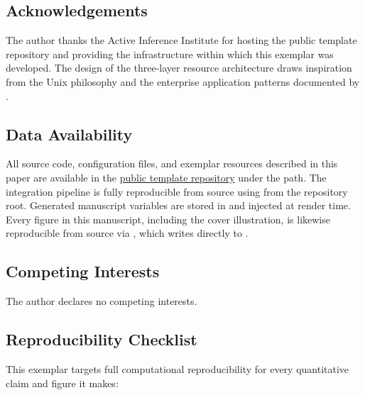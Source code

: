 \documentclass[
]{article}
\begin{document}
\subsection{Acknowledgements}\label{acknowledgements}

The author thanks the Active Inference Institute for hosting the public
template repository and providing the infrastructure within which this
exemplar was developed. The design of the three-layer resource
architecture draws inspiration from the Unix philosophy
\citep{Raymond2003art} and the enterprise application patterns
documented by \citep{Fowler2002patterns}.

\subsection{Data Availability}\label{data-availability}

All source code, configuration files, and exemplar resources described
in this paper are available in the
\href{https://github.com/docxology/template}{public template repository}
under the 
path. The integration pipeline is fully reproducible from source using
from the repository root. Generated manuscript variables are stored in
 and injected at render
time. Every figure in this manuscript, including the cover illustration,
is likewise reproducible from source via
,
which writes directly to .

\subsection{Competing Interests}\label{competing-interests}

The author declares no competing interests.

\subsection{Reproducibility Checklist}\label{reproducibility-checklist}

This exemplar targets full computational reproducibility for every
quantitative claim and figure it makes:
\end{document}
